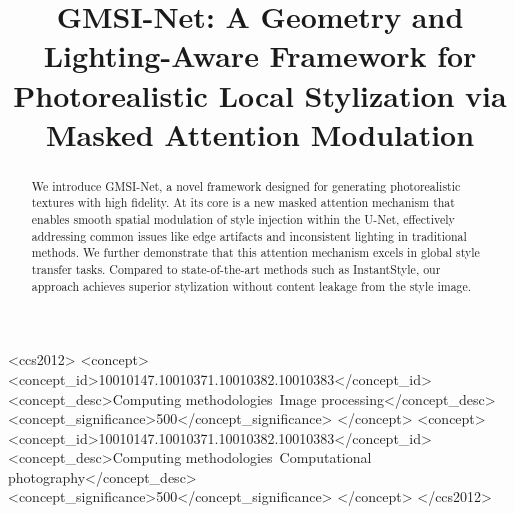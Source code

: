 \documentclass[sigconf]{acmart}
\begin{document}
\title{GMSI-Net: A Geometry and Lighting-Aware Framework for Photorealistic Local Stylization via Masked Attention Modulation}


\renewcommand{\shortauthors}{Anonymous et al.}


\begin{abstract}
We introduce GMSI-Net, a novel framework designed for generating photorealistic textures with high fidelity. At its core is a new masked attention mechanism that enables smooth spatial modulation of style injection within the U-Net, effectively addressing common issues like edge artifacts and inconsistent lighting in traditional methods. We further demonstrate that this attention mechanism excels in global style transfer tasks. Compared to state-of-the-art methods such as InstantStyle, our approach achieves superior stylization without content leakage from the style image.
\end{abstract}

%
\begin{CCSXML}
<ccs2012>
<concept>
<concept_id>10010147.10010371.10010382.10010383</concept_id>
<concept_desc>Computing methodologies~Image processing</concept_desc>
<concept_significance>500</concept_significance>
</concept>
<concept>
<concept_id>10010147.10010371.10010382.10010383</concept_id>
<concept_desc>Computing methodologies~Computational photography</concept_desc>
<concept_significance>500</concept_significance>
</concept>
</ccs2012>
\end{CCSXML}





\maketitle









\end{document}
